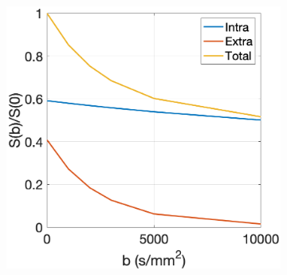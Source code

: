 \begin{figure}
\begin{subfigure}[]{0.4\textwidth}
    \includegraphics[width=\textwidth]{figures/frf_experiment/in_ex_tot_Kappa_6.png}
    \caption{}
  \end{subfigure}


\end{figure}

